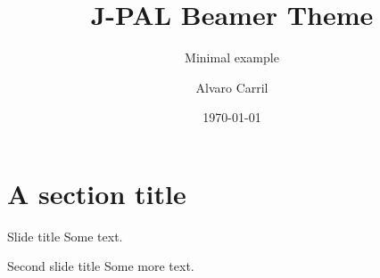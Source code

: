 \documentclass{beamer}
\title{J-PAL Beamer Theme}
\subtitle{Minimal example}
\date{\today}
\author{Alvaro Carril}
\institute{Abdul Latif Jameel Poverty Action Lab}
\begin{document}
\maketitle

\section{A section title}

\begin{frame}{Slide title}
Some text.
\end{frame}

\begin{frame}{Second slide title}
Some more text.
\end{frame}

\end{document}
